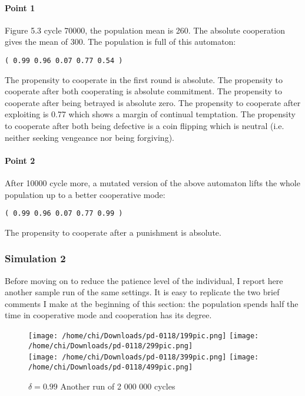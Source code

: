 \documentclass[12.5pt]{report}
\begin{document}
\paragraph{Point 1}


Figure 5.3 cycle 70000, the population mean is 260. The absolute cooperation gives the mean of 300. The population is full of this automaton:
\begin{verbatim}
( 0.99 0.96 0.07 0.77 0.54 )
\end{verbatim}

The propensity to cooperate in the first round is absolute. The propensity to cooperate after both cooperating is absolute commitment. The propensity to cooperate after being betrayed is absolute zero. The propensity to cooperate after exploiting is 0.77 which shows a margin of continual temptation. The propensity to cooperate after both being defective is a coin flipping which is neutral (i.e. neither seeking vengeance nor being forgiving).

\paragraph{Point 2}

After 10000 cycle more, a mutated version of the above automaton lifts the whole population up to a better cooperative mode:
\begin{verbatim}
( 0.99 0.96 0.07 0.77 0.99 )
\end{verbatim}

The propensity to cooperate after a punishment is absolute.

\subsubsection{Simulation 2}

Before moving on to reduce the patience level of the individual, I report here another sample run of the same settings. It is easy to replicate the two brief comments I make at the beginning of this section: the population spends half the time in cooperative mode and cooperation has its degree.

\begin{figure}[h!]
\texttt{[image: /home/chi/Downloads/pd-0118/199pic.png]}
\texttt{[image: /home/chi/Downloads/pd-0118/299pic.png]}\\
\texttt{[image: /home/chi/Downloads/pd-0118/399pic.png]}
\texttt{[image: /home/chi/Downloads/pd-0118/499pic.png]}
\caption{$\delta = 0.99$ Another run of 2 000 000 cycles}
\end{figure}
\end{document}
